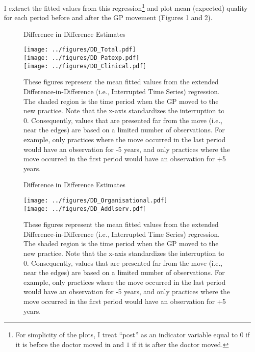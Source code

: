 \documentclass[11pt]{article}
\begin{document}
I extract the fitted values from this regression\footnote{For simplicity of the plots, I treat ``post'' as an indicator variable equal to $0$ if it is before the doctor moved in and $1$ if it is after the doctor moved.} and plot mean (expected) quality for each period before and after the GP movement (Figures 1 and 2).



\begin{figure}[htp]
\centering
\caption{Difference in Difference Estimates}
\texttt{[image: ../figures/DD\_Total.pdf]}\\
\texttt{[image: ../figures/DD\_Patexp.pdf]}\\
\texttt{[image: ../figures/DD\_Clinical.pdf]}\\



\caption*{These figures represent the mean fitted values from the extended Difference-in-Difference (i.e., Interrupted Time Series) regression. The shaded region is the time period when the GP moved to the new practice. Note that the x-axis standardizes the interruption to 0. Consequently, values that are presented far from the move (i.e., near the edges) are based on a limited number of observations. For example, only practices where the move occurred in the last period would have an observation for -5 years, and only practices where the move occurred in the first period would have an observation for +5 years.}
\label{fig:DD1}
\end{figure}

\begin{figure}[htp]
\centering
\caption{Difference in Difference Estimates}
\texttt{[image: ../figures/DD\_Organisational.pdf]}\\
\texttt{[image: ../figures/DD\_Addlserv.pdf]}\\

\caption*{These figures represent the mean fitted values from the extended Difference-in-Difference (i.e., Interrupted Time Series) regression. The shaded region is the time period when the GP moved to the new practice. Note that the x-axis standardizes the interruption to 0. Consequently, values that are presented far from the move (i.e., near the edges) are based on a limited number of observations. For example, only practices where the move occurred in the last period would have an observation for -5 years, and only practices where the move occurred in the first period would have an observation for +5 years.}
\label{fig:DD2}
\end{figure}
\end{document}
